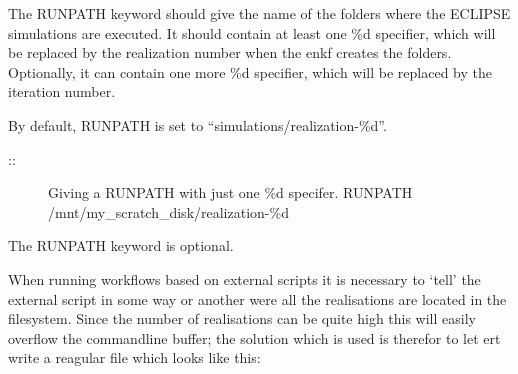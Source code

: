 \documentclass[letterpaper,10pt,english]{sphinxmanual}
\begin{document}
\begin{sphinxShadowBox}

The RUNPATH keyword should give the name of the folders where the ECLIPSE
simulations are executed. It should contain at least one \%d specifier, which
will be replaced by the realization number when the enkf creates the folders.
Optionally, it can contain one more \%d specifier, which will be replaced by
the iteration number.

By default, RUNPATH is set to “simulations/realization-\%d”.

\begin{description}
\item[{::}] \leavevmode
\textendash{} Giving a RUNPATH with just one \%d specifer.
RUNPATH /mnt/my\_scratch\_disk/realization-\%d

\end{description}


%
\begin{sphinxVerbatim}[commandchars=\\\{\}]
       
 
\end{sphinxVerbatim}

The RUNPATH keyword is optional.
\end{sphinxShadowBox}
\label{\detokenize{keywords/index:runpath-file}}
When running workflows based on external scripts it is necessary to ‘tell’ the
external script in some way or another were all the realisations are located in
the filesystem. Since the number of realisations can be quite high this will
easily overflow the commandline buffer; the solution which is used is therefor
to let ert write a reagular file which looks like this:

%
\begin{sphinxVerbatim}[commandchars=\\\{\}]
         
         
         
\end{sphinxVerbatim}
\end{document}
